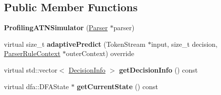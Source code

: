 \subsection*{Public Member Functions}
\begin{DoxyCompactItemize}
\item 
\mbox{\label{classantlr4_1_1atn_1_1ProfilingATNSimulator_a8ba8652d31dd48182cd971ee7306fd79}} 
{\bfseries Profiling\+A\+T\+N\+Simulator} (\hyperlink{classantlr4_1_1Parser}{Parser} $\ast$parser)
\item 
\mbox{\label{classantlr4_1_1atn_1_1ProfilingATNSimulator_ab75cfac2534e32419fca3820ad3e8143}} 
virtual size\+\_\+t {\bfseries adaptive\+Predict} (Token\+Stream $\ast$input, size\+\_\+t decision, \hyperlink{classantlr4_1_1ParserRuleContext}{Parser\+Rule\+Context} $\ast$outer\+Context) override
\item 
\mbox{\label{classantlr4_1_1atn_1_1ProfilingATNSimulator_aa202e757203f75c742017f3c4756322f}} 
virtual std\+::vector$<$ \hyperlink{classantlr4_1_1atn_1_1DecisionInfo}{Decision\+Info} $>$ {\bfseries get\+Decision\+Info} () const
\item 
\mbox{\label{classantlr4_1_1atn_1_1ProfilingATNSimulator_a882f7dbbfc19ca741b38f7059c2ad662}} 
virtual dfa\+::\+D\+F\+A\+State $\ast$ {\bfseries get\+Current\+State} () const
\end{DoxyCompactItemize}
